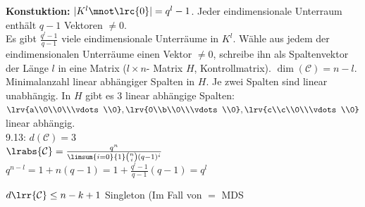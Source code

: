 		\textbf{Konstuktion:} $ |K^l\mnot\lrc{0}|=q^l-1 $. Jeder eindimensionale Unterraum enthält $ q-1 $ Vektoren $ \neq 0 $.\\
		Es gibt $ \frac{q^l-1}{q-1} $ viele eindimensionale Unterräume in $ K^l $. Wähle aus jedem der eindimensionalen Unterräume einen Vektor $ \neq 0 $, schreibe ihn als Spaltenvektor der Länge $ l $ in eine Matrix ($ l\times n $- Matrix $ H $, Kontrollmatrix). $ \dim(\mathcal{C})=n-l $.\\
		Minimalanzahl linear abhängiger Spalten in $ H $. Je zwei Spalten sind linear unabhängig. In $ H $ gibt es 3 linear abhängige Spalten:\\
		$ \lrv{a\\0\\0\\\vdots\\0},\lrv{0\\b\\0\\\vdots\\0},\lrv{c\\c\\0\\\vdots\\0} $ linear abhängig.\\
		9.13: $ d(\mathcal{C})=3 $\\
		$ \lrabs{\mathcal{C}}=\frac{q^n}{\limsum{i=0}{1}\binom{n}{i}(q-1)^i} $\\
		$ q^{n-l}=1+n(q-1)=1+\frac{q^l-1}{q-1}(q-1)=q^l $
		
		$d\lrr{\mathcal{C}}\leq n-k+1$ Singleton (Im Fall von $=$ MDS
	
